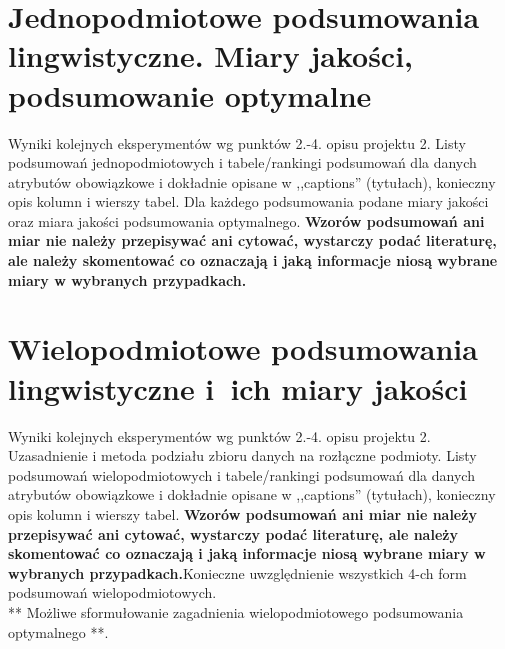 \documentclass{classrep}
\begin{document}




\section{ Jednopodmiotowe podsumowania lingwistyczne. Miary jakości, podsumowanie optymalne}
Wyniki kolejnych eksperymentów wg punktów 2.-4. opisu projektu 2.  Listy podsumowań
jednopodmiotowych i tabele/rankingi podsumowań dla danych atrybutów obowiązkowe i dokładnie opisane w ,,captions'' (tytułach), konieczny opis kolumn i wierszy tabel. Dla każdego podsumowania podane miary jakości oraz miara jakości podsumowania
optymalnego. {\bf Wzorów podsumowań ani miar nie należy przepisywać ani cytować, wystarczy podać literaturę, ale
należy skomentować co oznaczają i jaką informacje niosą wybrane miary w wybranych
przypadkach.}\\

\section{Wielopodmiotowe podsumowania lingwistyczne i~ich miary jakości} 
Wyniki kolejnych eksperymentów wg punktów 2.-4. opisu projektu 2. Uzasadnienie i
metoda podziału zbioru danych na rozłączne podmioty. Listy podsumowań
wielopodmiotowych i tabele/rankingi podsumowań dla danych atrybutów obowiązkowe i
dokładnie opisane w ,,captions'' (tytułach), konieczny opis kolumn i wierszy tabel.
{\bf Wzorów podsumowań ani miar nie należy przepisywać ani cytować, wystarczy podać literaturę, ale
należy skomentować co oznaczają i jaką informacje niosą wybrane miary w wybranych
przypadkach.}Konieczne uwzględnienie wszystkich 4-ch form podsumowań wielopodmiotowych. 
\\ 

** Możliwe sformułowanie zagadnienia wielopodmiotowego podsumowania optymalnego **.\\
\\
\end{document}
